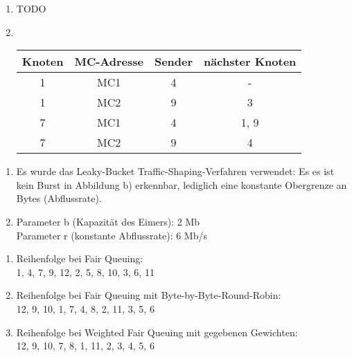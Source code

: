\documentclass[12pt]{scrartcl}
\begin{document}
\setcounter{exnum}{1}
    \begin{enumerate}[label=(\alph*)]
        \item  TODO
        \item \ \\
            \begin{tabular}{c|c|c|c}
            Knoten & MC-Adresse & Sender & nächster Knoten \\
            \hline
            1 & MC1 & 4 & - \\
            1 & MC2 & 9 & 3 \\
            \hline
            7 & MC1 & 4 & 1, 9 \\
            7 & MC2 & 9 & 4 \\
            \hline
            \end{tabular}
    \end{enumerate}
 
\setcounter{exnum}{2}
    \begin{enumerate}[label=(\alph*)]
        \item Es wurde das Leaky-Bucket Traffic-Shaping-Verfahren verwendet: Es es ist kein Burst in Abbildung b) erkennbar,
        lediglich eine konstante Obergrenze an Bytes (Abflussrate).
        \item Parameter b (Kapazität des Eimers): 2 Mb\\
        Parameter r (konstante Abflussrate): 6 Mb/s
    \end{enumerate}

\setcounter{exnum}{3}
    \begin{enumerate}[label=(\alph*)]
        \item  Reihenfolge bei Fair Queuing: \\
            1, 4, 7, 9, 12, 2, 5, 8, 10, 3, 6, 11
        \item Reihenfolge bei Fair Queuing mit Byte-by-Byte-Round-Robin:\\
            12, 9, 10, 1, 7, 4, 8, 2, 11, 3, 5, 6 
        \item Reihenfolge bei Weighted Fair Queuing mit gegebenen Gewichten: \\
            12, 9, 10, 7, 8, 1, 11, 2, 3, 4, 5, 6
    \end{enumerate}

\end{document}
